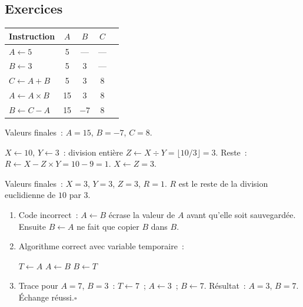 

\subsection*{Exercices}


\renewcommand{\arraystretch}{1.3}
\begin{center}
\begin{tabular}{lcccc}
\toprule
Instruction & $A$ & $B$ & $C$ \\
\midrule
$A\leftarrow5$ & 5 & — & — \\
$B\leftarrow3$ & 5 & 3 & — \\
$C\leftarrow A+B$ & 5 & 3 & 8 \\
$A\leftarrow A\times B$ & 15 & 3 & 8 \\
$B\leftarrow C-A$ & 15 & $-7$ & 8 \\
\bottomrule
\end{tabular}
\end{center}
Valeurs finales~: $A=15$, $B=-7$, $C=8$.


$X\leftarrow10$, $Y\leftarrow3$~: division enti\`ere $Z\leftarrow X\div Y = \lfloor10/3\rfloor=3$.
Reste~: $R\leftarrow X-Z\times Y=10-9=1$.
$X\leftarrow Z=3$.

Valeurs finales~: $X=3$, $Y=3$, $Z=3$, $R=1$.
$R$ est le reste de la division euclidienne de $10$ par $3$.


\begin{enumerate}
  \item Code incorrect~: $A\leftarrow B$ \'ecrase la valeur de $A$ avant qu'elle
        soit sauvegard\'ee. Ensuite $B\leftarrow A$ ne fait que copier $B$ dans $B$.
  \item Algorithme correct avec variable temporaire~:
\begin{algorithm}[H]
\caption{\'Echange correct}
$T \leftarrow A$\;
$A \leftarrow B$\;
$B \leftarrow T$\;
\end{algorithm}
  \item Trace pour $A=7$, $B=3$~: $T\leftarrow7$~; $A\leftarrow3$~; $B\leftarrow7$.
        R\'esultat~: $A=3$, $B=7$. \'Echange r\'eussi.\hfill$\square$
\end{enumerate}

